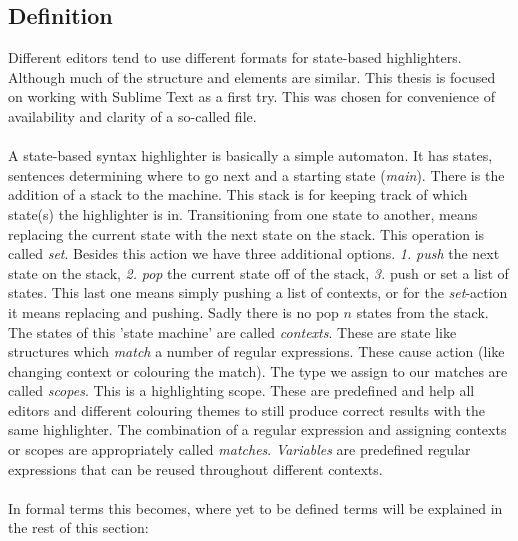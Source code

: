	\subsection{Definition}
	Different editors tend to use different formats for state-based highlighters. Although much of the structure and elements are similar. This thesis is focused on working with Sublime Text as a first try. This was chosen for convenience of availability and clarity of a so-called  file.\\\\
	A state-based syntax highlighter is basically a simple automaton. It has states, sentences determining where to go next and a starting state (\emph{main}). There is the addition of a stack to the machine. This stack is for keeping track of which state(s) the highlighter is in. Transitioning from one state to another, means replacing the current state with the next state on the stack. This operation is called \emph{set}. Besides this action we have three additional options. \textit{1.} \emph{push} the next state on the stack, \textit{2.} \emph{pop} the current state off of the stack, \textit{3.} push or set a list of states. This last one means simply pushing a list of contexts, or for the \textit{set}-action it means replacing and pushing. Sadly there is no pop $n$ states from the stack.\\
	The states of this 'state machine' are called \emph{contexts}. These are state like structures which \emph{match} a number of regular expressions. These cause action (like changing context or colouring the match). The type we assign to our matches are called \emph{scopes}. This is a highlighting scope. These are predefined and help all editors and different colouring themes to still produce correct results with the same highlighter. The combination of a regular expression and assigning contexts or scopes are appropriately called \emph{matches}. \emph{Variables} are predefined regular expressions that can be reused throughout different contexts.\\\\
	In formal terms this becomes, where yet to be defined terms will be explained in the rest of this section:
